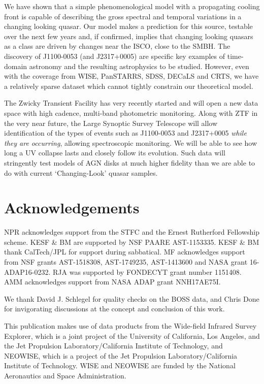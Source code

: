 \documentclass[a4paper,fleqn,usenatbib]{mnras}
\begin{document}
We have shown that a simple
phenomenological model with a propagating cooling front is capable of
describing the gross spectral and temporal variations in a changing
looking quasar. Our model makes a prediction for this source, testable
over the next few years and, if confirmed, implies that changing
looking quasars as a class are driven by changes near the ISCO, close
to the SMBH. The discovery of J1100-0053 (and J2317+0005) are specific
key examples of time-domain astronomy and the resulting astrophysics
to be studied. However, even with the coverage from WISE, PanSTARRS,
SDSS, DECaLS and CRTS, we have a relatively sparse dataset which
cannot tightly constrain our theoretical model. 

The Zwicky Transient
Facility \citep[ZTF; ][]{Bellm2014} has very recently started and will
open a new data space with high cadence, multi-band photometric
monitoring. Along with ZTF in the very near future, the Large Synoptic
Survey Telescope \citep{Ivezic2008, LSST_ScienceBookV2} will allow
identification of the types of events such as J1100-0053 and
J2317+0005 \emph{while they are occurring}, allowing spectroscopic
monitoring. We will be able to see how long a UV collapse lasts and
closely follow its evolution.  Such data will stringently test models
of AGN disks at much higher fidelity than we are able to do with
current `Changing-Look' quasar samples.

\smallskip
\smallskip


\smallskip
\smallskip


\section*{Acknowledgements}
NPR acknowledges support from the STFC and the Ernest Rutherford
Fellowship scheme.  KESF \& BM are supported by NSF PAARE
AST-1153335. KESF \& BM thank CalTech/JPL for support during
sabbatical.  MF acknowledges support from NSF grants AST-1518308,
AST-1749235, AST-1413600 and NASA grant 16-ADAP16-0232.  RJA was
supported by FONDECYT grant number 1151408. AMM acknowledges
support from NASA ADAP grant NNH17AE75I.

We thank David J. Schlegel for quality checks on the BOSS data, and
Chris Done for invigorating discussions at the concept and conclusion
of this work.

This publication makes use of data products from the Wide-field
Infrared Survey Explorer, which is a joint project of the University
of California, Los Angeles, and the Jet Propulsion
Laboratory/California Institute of Technology, and NEOWISE, which is a
project of the Jet Propulsion Laboratory/California Institute of
Technology. WISE and NEOWISE are funded by the National Aeronautics
and Space Administration.
\end{document}

